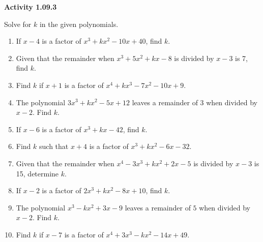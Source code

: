 \vspace{0.3ex}
\noindent\textbf{Activity 1.09.3}

\vspace{0.2ex}

Solve for \( k \) in the given polynomials.
\begin{enumerate}
    \item If \( x - 4 \) is a factor of \( x^3 + kx^2 - 10x + 40 \), find \( k \).
    \item Given that the remainder when \( x^3 + 5x^2 + kx - 8 \) is divided by \( x - 3 \) is 7, find \( k \).
    \item Find \( k \) if \( x + 1 \) is a factor of \( x^4 + kx^3 - 7x^2 - 10x + 9 \).
    \item The polynomial \( 3x^3 + kx^2 - 5x + 12 \) leaves a remainder of 3 when divided by \( x - 2 \). Find \( k \).
    \item If \( x - 6 \) is a factor of \( x^3 + kx - 42 \), find \( k \).
    \item Find \( k \) such that \( x + 4 \) is a factor of \( x^3 + kx^2 - 6x - 32 \).
    \item Given that the remainder when \( x^4 - 3x^3 + kx^2 + 2x - 5 \) is divided by \( x - 3 \) is 15, determine \( k \).
    \item If \( x - 2 \) is a factor of \( 2x^3 + kx^2 - 8x + 10 \), find \( k \).
    \item The polynomial \( x^3 - kx^2 + 3x - 9 \) leaves a remainder of \( 5 \) when divided by \( x - 2 \). Find \( k \).
    \item Find \( k \) if \( x - 7 \) is a factor of \( x^4 + 3x^3 - kx^2 - 14x + 49 \).
\end{enumerate}
